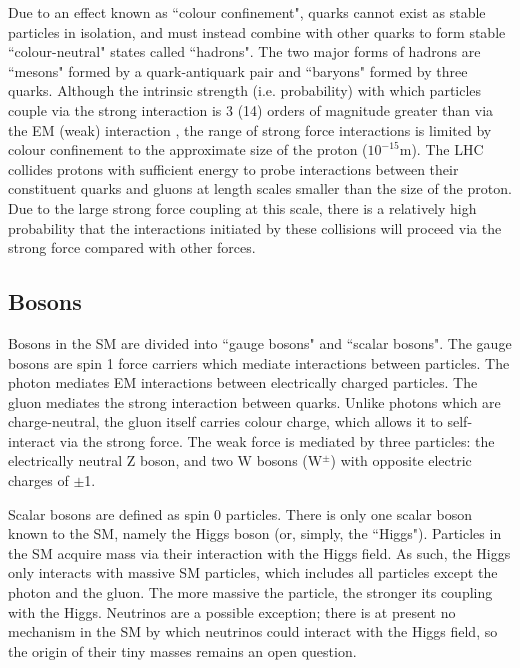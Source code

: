 Due to an effect known as ``colour confinement", quarks cannot exist as stable particles in isolation, and must instead combine with other quarks to form stable ``colour-neutral" states called ``hadrons". The two major forms of hadrons are ``mesons" formed by a quark-antiquark pair and ``baryons" formed by three quarks. Although the intrinsic strength (i.e. probability) with which particles couple via the strong interaction is 3 (14) orders of magnitude greater than via the EM (weak) interaction \cite{griffiths_2008}, the range of strong force interactions is limited by colour confinement to the approximate size of the proton (\(10^{-15}\)m). The LHC collides protons with sufficient energy to probe interactions between their constituent quarks and gluons at length scales smaller than the size of the proton. Due to the large strong force coupling at this scale, there is a relatively high probability that the interactions initiated by these collisions will proceed via the strong force compared with other forces. 

\subsection{Bosons}

Bosons in the SM are divided into ``gauge bosons" and ``scalar bosons". The gauge bosons are spin 1 force carriers which mediate interactions between particles. The photon mediates EM interactions between electrically charged particles. The gluon mediates the strong interaction between quarks. Unlike photons which are charge-neutral, the gluon itself carries colour charge, which allows it to self-interact via the strong force. The weak force is mediated by three particles: the electrically neutral Z boson, and two W bosons (W$^\pm$) with opposite electric charges of $\pm$1. 

Scalar bosons are defined as spin 0 particles. There is only one scalar boson known to the SM, namely the Higgs boson (or, simply, the ``Higgs"). Particles in the SM acquire mass via their interaction with the Higgs field. As such, the Higgs only interacts with massive SM particles, which includes all particles except the photon and the gluon. The more massive the particle, the stronger its coupling with the Higgs. Neutrinos are a possible exception; there is at present no mechanism in the SM by which neutrinos could interact with the Higgs field, so the origin of their tiny masses remains an open question.  

